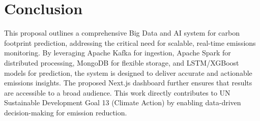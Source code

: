 \documentclass[conference]{IEEEtran}
\begin{document}
\section{Conclusion}

This proposal outlines a comprehensive Big Data and AI system for carbon footprint prediction, addressing the critical need for scalable, real-time emissions monitoring. By leveraging Apache Kafka for ingestion, Apache Spark for distributed processing, MongoDB for flexible storage, and LSTM/XGBoost models for prediction, the system is designed to deliver accurate and actionable emissions insights. The proposed Next.js dashboard further ensures that results are accessible to a broad audience. This work directly contributes to UN Sustainable Development Goal 13 (Climate Action) by enabling data-driven decision-making for emission reduction.
\end{document}
